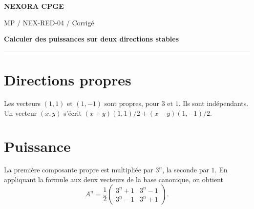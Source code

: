 \documentclass[11pt,a4paper]{article}
\begin{document}
{\small\bfseries\color{nexorablue} NEXORA CPGE}\par
{\small MP / NEX-RED-04 / Corrigé}\par
{\LARGE\bfseries Calculer des puissances sur deux directions stables}\par
\vspace{0.25em}\hrule\vspace{0.6em}

\section*{Directions propres}
Les vecteurs $(1,1)$ et $(1,-1)$ sont propres, pour $3$ et $1$. Ils sont indépendants. Un vecteur $(x,y)$ s’écrit $(x+y)(1,1)/2+(x-y)(1,-1)/2$.

\section*{Puissance}
La première composante propre est multipliée par $3^n$, la seconde par $1$. En appliquant la formule aux deux vecteurs de la base canonique, on obtient
\[ A^n=\frac12\begin{pmatrix}3^n+1&3^n-1\\3^n-1&3^n+1\end{pmatrix}. \]
\end{document}
